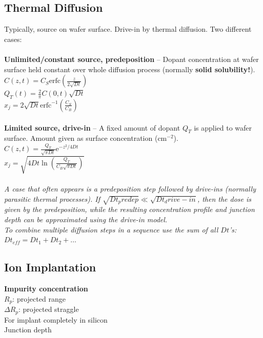 \documentclass[6pt,letterpaper]{scrartcl}
\newcommand\erfc{\mathrm{erfc}}
\begin{document}
\begin{multicols}{3}
\subsection{Thermal Diffusion}
Typically, source on wafer surface. Drive-in by thermal diffusion. Two different cases:\\
\\
\textbf{Unlimited/constant source, predeposition} -- Dopant concentration at wafer surface held constant over whole diffusion process (normally \textbf{solid solubility!}). \\
$C(z,t) = C_S \erfc \left( \frac{z}{2\sqrt{Dt}} \right)$ \\
$Q_T(t) = \frac{2}{\pi} C(0,t) \sqrt{Dt}$ \\
$x_j = 2\sqrt{Dt} \erfc^{-1} \left( \frac{C_S}{C_B} \right)$ \\
\\
\textbf{Limited source, drive-in} -- A fixed amount of dopant $Q_T$ is applied to wafer surface. Amount given as surface concentration ($\mathrm{cm}^{-2}$). \\
$C(z,t) = \frac{Q_T}{\sqrt{\pi Dt}} \mathrm{e}^{-z^2/4Dt}$ \\
$x_j = \sqrt{4Dt \ln \left( \frac{Q_T}{C_B \sqrt{\pi Dt}} \right) }$ \\
\\
\textit{A case that often appears is a predeposition step followed by drive-ins (normally parasitic thermal processes). If $\sqrt{Dt_predep} \ll \sqrt{Dt_drive-in}$, then the dose is given by the predeposition, while the resulting concentration profile and junction depth can be approximated using the drive-in model.}\\
\textit{To combine multiple diffusion steps in a sequence use the sum of all $Dt$'s: $Dt_{eff} = Dt_1 + Dt_2 + \dots$}

\subsection{Ion Implantation}
\textbf{Impurity concentration}  \\
$R_p$: projected range \\
$\Delta R_p$: projected straggle \\
For implant completely in silicon  \\
Junction depth 







\end{multicols}


\end{document}
